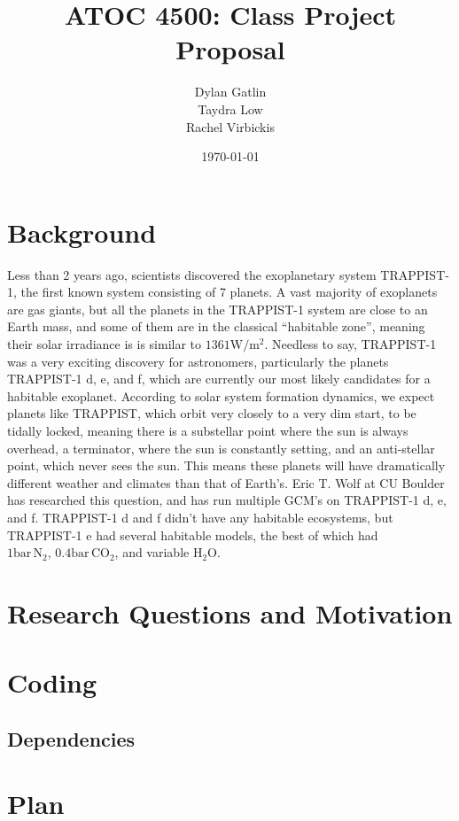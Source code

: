 \documentclass[11pt]{article}
\title{ATOC 4500: Class Project Proposal}
\author{Dylan Gatlin\\Taydra Low\\Rachel Virbickis}
\date{\today}
\begin{document}
\maketitle
\section{Background}
Less than 2 years ago, scientists discovered the exoplanetary system TRAPPIST-1, the first known system consisting of 7 planets. A vast majority of exoplanets are gas giants, but all the planets in the TRAPPIST-1 system are close to an Earth mass, and some of them are in the classical ``habitable zone'', meaning their solar irradiance is is similar to $1361 \si{\watt \per \meter^2}$. Needless to say, TRAPPIST-1 was a very exciting discovery for astronomers, particularly the planets TRAPPIST-1 d, e, and f, which are currently our most likely candidates for a habitable exoplanet. According to solar system formation dynamics, we expect planets like TRAPPIST, which orbit very closely to a very dim start, to be tidally locked, meaning there is a substellar point where the sun is always overhead, a terminator, where the sun is constantly setting, and an anti-stellar point, which never sees the sun. This means these planets will have dramatically different weather and climates than that of Earth's. Eric T. Wolf at CU Boulder has researched this question, and has run multiple GCM's on TRAPPIST-1 d, e, and f. TRAPPIST-1 d and f didn't have any habitable ecosystems, but TRAPPIST-1 e had several habitable models, the best of which had $1\si{\bar}\,\mathrm{N_2},\, 0.4\si{\bar}\,\mathrm{CO_2}$, and variable $\mathrm{H_2O}$.
\section{Research Questions and Motivation}
\section{Coding}
\subsection{Dependencies}

\section{Plan}
\end{document}
